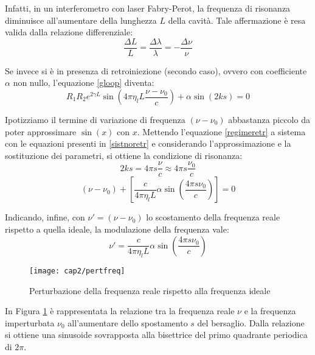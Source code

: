 Infatti, in un interferometro con laser Fabry-Perot, la frequenza di risonanza diminuisce all'aumentare della lunghezza $L$ della cavità. Tale affermazione è resa valida dalla relazione differenziale:
\begin{equation}
	\frac{\Delta L}{L} = \frac{\Delta \lambda}{\lambda} = - \frac{\Delta \nu}{\nu}
\end{equation}

Se invece si è in presenza di retroiniezione (secondo caso), ovvero con coefficiente $\alpha$ non nullo, l'equazione \ref{gloop} diventa:
\begin{equation}
	R_1R_2e^{2\gamma L}\sin{ \left (4\pi \eta_l L \frac{\nu - \nu_0}{c} \right )} + \alpha \sin{(2ks)} = 0
	\label{regimeretr}
\end{equation}

Ipotizziamo il termine di variazione di frequenza $(\nu-\nu_0)$ abbastanza piccolo da poter approssimare $\sin(x)$ con $x$. Mettendo l'equazione \ref{regimeretr} a sistema con le equazioni presenti in \ref{sistnoretr} e considerando l'approssimazione e la sostituzione dei parametri, si ottiene la condizione di risonanza:
\begin{equation}
	2ks=4\pi s \frac{\nu}{c} \approx 4\pi s \frac{\nu_0}{c}
\end{equation}
\begin{equation}
	(\nu - \nu_0) + \left[ \frac{c}{4\pi \eta_l L}\alpha \sin{\left (\frac{4 \pi s \nu_0}{c}\right )} \right] = 0
\end{equation}

Indicando, infine, con $\nu'=(\nu-\nu_0)$ lo scostamento della frequenza reale rispetto a quella ideale, la modulazione della frequenza vale: 
\begin{equation}
	\nu'= \frac{c}{4\pi \eta_l L} \alpha \sin \left ( \frac{4 \pi s \nu_0}{c} \right )
\end{equation}

\begin{figure}[H] 
  \begin{center}
    \texttt{[image: cap2/pertfreq]}
    \caption{Perturbazione della frequenza reale rispetto alla frequenza ideale}
    \label{pertfreq}
  \end{center}
\end{figure}

In Figura \ref{pertfreq} è rappresentata la relazione tra la frequenza reale $\nu$ e la frequenza imperturbata $\nu_0$ all'aumentare dello spostamento $s$ del bersaglio. Dalla relazione si ottiene una sinusoide sovrapposta alla bisettrice del primo quadrante periodica di $2\pi$. 

